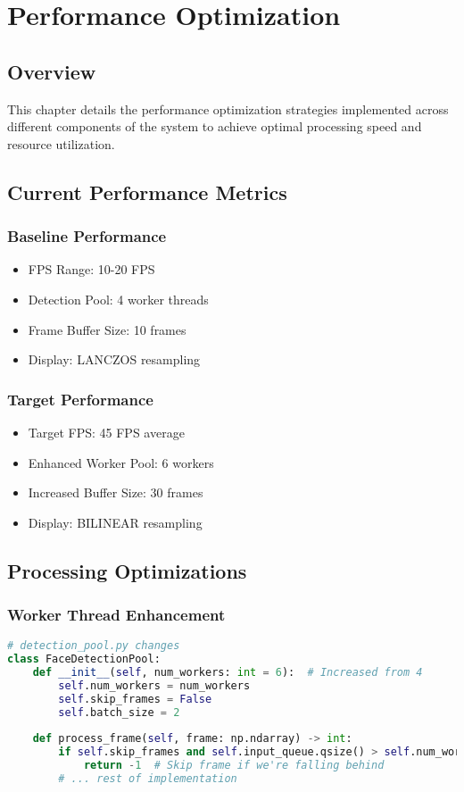 \chapter{Performance Optimization}

\section{Overview}
This chapter details the performance optimization strategies implemented across different components of the system to achieve optimal processing speed and resource utilization.

\section{Current Performance Metrics}

\subsection{Baseline Performance}
\begin{itemize}
    \item FPS Range: 10-20 FPS
    \item Detection Pool: 4 worker threads
    \item Frame Buffer Size: 10 frames
    \item Display: LANCZOS resampling
\end{itemize}

\subsection{Target Performance}
\begin{itemize}
    \item Target FPS: 45 FPS average
    \item Enhanced Worker Pool: 6 workers
    \item Increased Buffer Size: 30 frames
    \item Display: BILINEAR resampling
\end{itemize}

\section{Processing Optimizations}

\subsection{Worker Thread Enhancement}
\begin{lstlisting}[language=Python]
# detection_pool.py changes
class FaceDetectionPool:
    def __init__(self, num_workers: int = 6):  # Increased from 4
        self.num_workers = num_workers
        self.skip_frames = False
        self.batch_size = 2
        
    def process_frame(self, frame: np.ndarray) -> int:
        if self.skip_frames and self.input_queue.qsize() > self.num_workers * 2:
            return -1  # Skip frame if we're falling behind
        # ... rest of implementation
\end{lstlisting}

